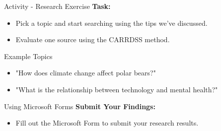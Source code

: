 \documentclass{beamer}
\makeatletter
\newenvironment{myalert}{\begin{itemize}
[<+-| alert@+>]
}
{\end{itemize}}
\makeatother
\begin{document}
\begin{frame}{\huge Activity - Research Exercise}
  \textbf{\huge Task:}
  \begin{myalert}
    \item Pick a topic and start searching using the tips we’ve discussed.
    \item Evaluate one source using the CARRDSS method.
  \end{myalert}
\end{frame}

\begin{frame}{\huge Example Topics}
  \begin{myalert}
    \item "How does climate change affect polar bears?"
    \item "What is the relationship between technology and mental health?"
  \end{myalert}
\end{frame}

\begin{frame}{\huge Using Microsoft Forms}
  \textbf{\huge Submit Your Findings:}
  \begin{myalert}
    \item Fill out the Microsoft Form to submit your research results.
  \end{myalert}
\end{frame}
\end{document}
